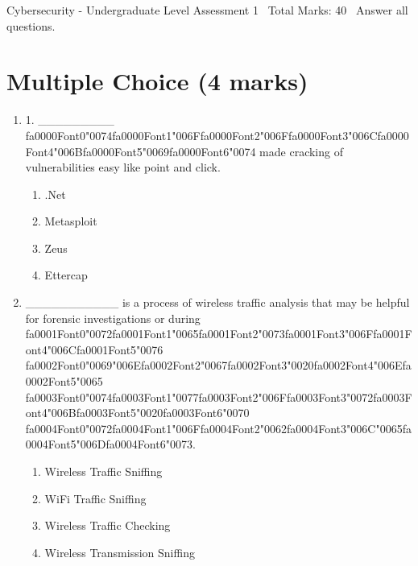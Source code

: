 \documentclass[12pt]{article}
\begin{document}
\begin{center}
Cybersecurity - Undergraduate Level Assessment 1 \
Total Marks: 40 \
Answer all questions.
\end{center}

\section*{Multiple Choice (4 marks)}
\begin{enumerate}[label=\arabic*.]
\item 1. \_\_\_\_\_\_\_\_\_ {\csname fa0000Font0\endcsname\char"0074}{\csname fa0000Font1\endcsname\char"006F}{\csname fa0000Font2\endcsname\char"006F}{\csname fa0000Font3\endcsname\char"006C}{\csname fa0000Font4\endcsname\char"006B}{\csname fa0000Font5\endcsname\char"0069}{\csname fa0000Font6\endcsname\char"0074} made cracking of vulnerabilities easy like point and click.
\begin{enumerate}[label=(\alph*)]
    \item .Net
    \item Metasploit
    \item Zeus
    \item Ettercap
\end{enumerate}
\item \_\_\_\_\_\_\_\_\_\_\_ is a process of wireless traffic analysis that may be helpful for forensic investigations or during {\csname fa0001Font0\endcsname\char"0072}{\csname fa0001Font1\endcsname\char"0065}{\csname fa0001Font2\endcsname\char"0073}{\csname fa0001Font3\endcsname\char"006F}{\csname fa0001Font4\endcsname\char"006C}{\csname fa0001Font5\endcsname\char"0076} {\csname fa0002Font0\endcsname\char"0069}{\char"006E}{\csname fa0002Font2\endcsname\char"0067}{\csname fa0002Font3\endcsname\char"0020}{\csname fa0002Font4\endcsname\char"006E}{\csname fa0002Font5\endcsname\char"0065} {\csname fa0003Font0\endcsname\char"0074}{\csname fa0003Font1\endcsname\char"0077}{\csname fa0003Font2\endcsname\char"006F}{\csname fa0003Font3\endcsname\char"0072}{\csname fa0003Font4\endcsname\char"006B}{\csname fa0003Font5\endcsname\char"0020}{\csname fa0003Font6\endcsname\char"0070} {\csname fa0004Font0\endcsname\char"0072}{\csname fa0004Font1\endcsname\char"006F}{\csname fa0004Font2\endcsname\char"0062}{\csname fa0004Font3\endcsname\char"006C}{\char"0065}{\csname fa0004Font5\endcsname\char"006D}{\csname fa0004Font6\endcsname\char"0073}.
\begin{enumerate}[label=(\alph*)]
    \item Wireless Traffic Sniffing
    \item WiFi Traffic Sniffing
    \item Wireless Traffic Checking
    \item Wireless Transmission Sniffing
\end{enumerate}
\end{enumerate}
\end{document}
